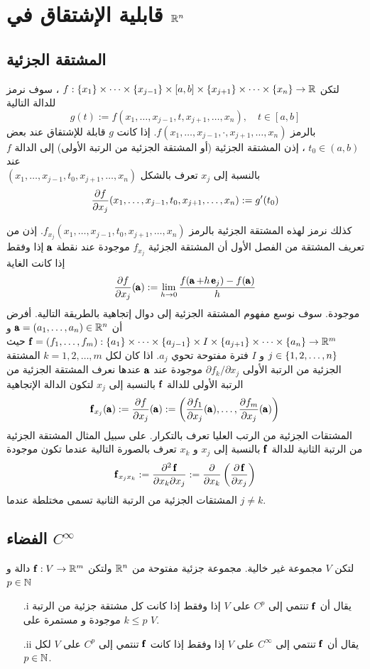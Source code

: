 \chapter{قابلية الإشتقاق في $\mathbb{R}^n$}
\thispagestyle{empty}
\newpage
\section{المشتقة الجزئية}
\begin{definition}
    لتكن $f:\left\{x_1\right\}\times\dots\times\left\{x_{j-1}\right\}\times[a,b]\times\left\{x_{j+1}\right\}\times\dots\times\left\{x_n\right\}\to\mathbb{R}$ ، سوف نرمز للدالة التالية
    \[
    g(t):=f(x_1,\dots,x_{j-1},t,x_{j+1},\dots,x_n),\quad t\in[a,b]
    \]
    بالرمز $f(x_1,\dots,x_{j-1},\cdot,x_{j+1},\dots,x_n)$. إذا كانت $g$ قابلة للإشتقاق عند بعض $t_0\in(a,b)$ ، إذن المشتقة الجزئية (أو المشتقة الجزئية من الرتبة الأولى) إلى الدالة $f$ عند \\$(x_1,\dots,x_{j-1},t_0,x_{j+1},\dots,x_n)$ بالنسبة إلى $x_{j}$ تعرف بالشكل
    \[
    \dfrac{\partial f}{\partial x_j}(x_1,\dots,x_{j-1},t_0,x_{j+1},\dots,x_n):=g^{\prime}(t_0)
    \]
 \end{definition}
    كذلك نرمز لهذه المشتقة الجزئية بالرمز $f_{x_j}(x_1,\dots,x_{j-1},t_0,x_{j+1},\dots,x_n)$. إذن من تعريف المشتقة من الفصل الأول أن المشتقة الجزئية $f_{x_{j}}$ موجودة عند نقطة $\operatorname{\pmb{\mathrm{a}}}$ إذا وفقط إذا كانت الغاية
\[
\dfrac{\partial f}{\partial x_j}(\operatorname{\pmb{\mathrm{a}}}):=\lim\limits_{h\rightarrow 0}\frac{f(\operatorname{\pmb{\mathrm{a}}}+h\operatorname{\pmb{\mathrm{e}}}_j)-f(\operatorname{\pmb{\mathrm{a}}})}{h}
\]
موجودة. سوف نوسع مفهوم المشتقة الجزئية إلى دوال إتجاهية بالطريقة التالية. أفرض أن $\operatorname{\pmb{\mathrm{a}}}=(a_1,\dots,a_n)\in\mathbb{R}^n$ و $\operatorname{\pmb{\mathrm{f}}}=(f_1,\dots,f_m):\left\{a_1\right\}\times\dots\times\left\{a_{j-1}\right\}\times I\times\left\{a_{j+1}\right\}\times\dots\times\left\{a_n\right\}\rightarrow \mathbb{R}^m$ حيث $j\in\left\{1,2,\dots,n\right\}$ و $I$ فترة مفتوحة تحوي $a_j$. اذا كان لكل $k=1,2,\dots,m$ المشتقة الجزئية من الرتبة الأولى $\partial f_k/\partial x_j$ موجودة عند $\operatorname{\pmb{\mathrm{a}}}$ عندها نعرف المشتقة الجزئية من الرتبة الأولى للدالة $\operatorname{\pmb{\mathrm{f}}}$ بالنسبة إلى $x_j$ لتكون الدالة الإتجاهية
\[
\operatorname{\pmb{\mathrm{f}}}_{x_j}(\operatorname{\pmb{\mathrm{a}}}):=\dfrac{\partial f}{\partial x_j}(\operatorname{\pmb{\mathrm{a}}}):=\left(\dfrac{\partial f_1}{\partial x_j}(\operatorname{\pmb{\mathrm{a}}}),\dots,\dfrac{\partial f_m}{\partial x_j}(\operatorname{\pmb{\mathrm{a}}})\right)
\]
المشتقات الجزئية من الرتب العليا تعرف بالتكرار. على سبيل المثال المشتقة الجزئية من الرتبة الثانية للدالة $\operatorname{\pmb{\mathrm{f}}}$ بالنسبة إلى $x_j$ و $x_k$ تعرف بالصورة التالية عندما تكون موجودة
\[
\operatorname{\pmb{\mathrm{f}}}_{x_jx_k}:=\dfrac{\partial^2\operatorname{\pmb{\mathrm{f}}}}{\partial x_k\partial x_j}:=\dfrac{\partial}{\partial x_k}\left(\dfrac{\partial\operatorname{\pmb{\mathrm{f}}}}{\partial x_j}\right)
\]
المشتقات الجزئية من الرتبة الثانية تسمى مختلطة عندما $j\neq k$.

\section{الفضاء $C^{\infty}$}
\begin{definition}
    لتكن $V$ مجموعة غير خالية. مجموعة جزئية مفتوحة من $\mathbb{R}^n$ ولتكن $\operatorname{\pmb{\mathrm{f}}}:V\to\mathbb{R}^m$ دالة و $p\in\mathbb{N}$ 
    \begin{enumerate}
        \item[.i] يقال أن $\operatorname{\pmb{\mathrm{f}}}$ تنتمي إلى $C^p$ على $V$ إذا وفقط إذا كانت كل مشتقة جزئية من الرتبة $k\leq p$ موجودة و مستمرة على $V$.

        \item[.ii] يقال أن $\operatorname{\pmb{\mathrm{f}}}$ تنتمي إلى $C^{\infty}$ على $V$ إذا وفقط إذا كانت $\operatorname{\pmb{\mathrm{f}}}$ تنتمي إلى $C^p$ على $V$ لكل $p\in\mathbb{N}$.
    \end{enumerate}
\end{definition}

